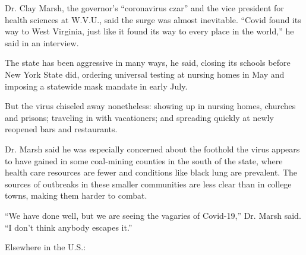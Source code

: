 Dr. Clay Marsh, the governor's ``coronavirus czar'' and the vice
president for health sciences at W.V.U., said the surge was almost
inevitable. ``Covid found its way to West Virginia, just like it found
its way to every place in the world,'' he said in an interview.

The state has been aggressive in many ways, he said, closing its schools
before New York State did, ordering universal testing at nursing homes
in May and imposing a statewide mask mandate in early July.

But the virus chiseled away nonetheless: showing up in nursing homes,
churches and prisons; traveling in with vacationers; and spreading
quickly at newly reopened bars and restaurants.

Dr. Marsh said he was especially concerned about the foothold the virus
appears to have gained in some coal-mining counties in the south of the
state, where health care resources are fewer and conditions like black
lung are prevalent. The sources of outbreaks in these smaller
communities are less clear than in college towns, making them harder to
combat.

``We have done well, but we are seeing the vagaries of Covid-19,'' Dr.
Marsh said. ``I don't think anybody escapes it.''

Elsewhere in the U.S.:

